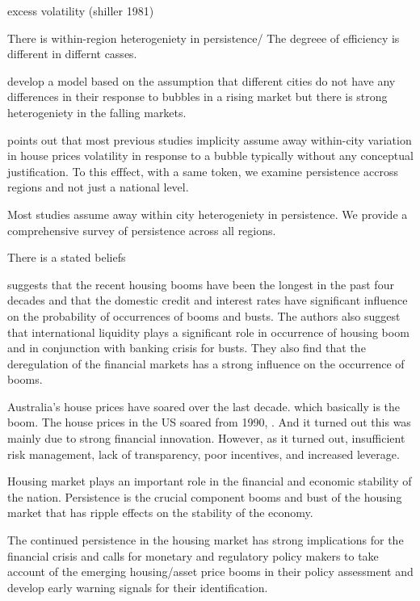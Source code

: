 \documentclass[AEJ,reqno, draftmode]{AEA}
\begin{document}
excess volatility  (shiller 1981)

There is within-region heterogeniety in persistence/ The degreee of efficiency is different in differnt casses.

\citep{Liu2016HousingDynamics} develop a model based on the assumption that different cities do not have any differences in their response to bubbles in a rising market but there is strong heterogeniety in the falling markets.

\citep{Liu2016HousingDynamics} points out that most previous studies implicity assume away within-city variation in house prices volatility in response to a bubble typically without any conceptual justification.  To this efffect, with a same token, we examine persistence accross regions and not just a national level.



Most studies assume away within city heterogeniety in persistence. We provide a comprehensive survey of persistence across all regions.



There is a stated beliefs 



\citet{AGNELLO2011171} suggests that the recent housing booms have been the longest in the past four decades and that the domestic credit and interest rates have significant influence on the probability of occurrences of booms and busts. The authors also suggest that international liquidity plays a significant role in occurrence of housing boom and in conjunction with banking crisis for busts. They also find that the deregulation of the financial markets has a strong influence on the occurrence of booms\citet{AGNELLO2011171}.

Australia's house prices have soared over the last decade. which basically is the boom. The house prices in the US soared from 1990, \citet{AGNELLO2011171}. And it turned out this was mainly due to strong financial innovation. However,  as it turned out, insufficient risk management, lack of transparency, poor incentives, and increased leverage.


Housing market plays an important role in the financial and economic stability of the nation. Persistence is the crucial component booms and bust of the housing market that has ripple effects on the stability of the economy.

The continued persistence in the housing market has strong implications for the financial crisis and calls for monetary and regulatory policy makers to take account of the emerging housing/asset price booms in their policy assessment and develop early warning signals for their identification.
\end{document}
